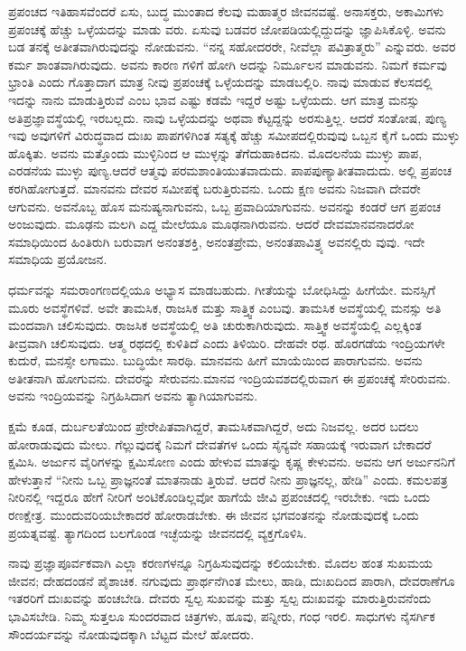 ಪ್ರಪಂಚದ ಇತಿಹಾಸವೆಂದರೆ ಏಸು, ಬುದ್ಧ ಮುಂತಾದ ಕೆಲವು ಮಹಾತ್ಮರ ಜೀವನವಷ್ಟೆ. ಅನಾಸಕ್ತರು, ಅಕಾಮಿಗಳು ಪ್ರಪಂಚಕ್ಕೆ ಹೆಚ್ಚು ಒಳ್ಳೆಯದನ್ನು ಮಾಡು ವರು. ಏಸುವು ಬಡವರ ಜೋಪಡಿಯಲ್ಲಿದ್ದುದನ್ನು ಜ್ಞಾಪಿಸಿಕೊಳ್ಳಿ. ಅವನು ಬಡ ತನಕ್ಕೆ ಅತೀತವಾಗಿರುವುದನ್ನು ನೋಡುವನು. “ನನ್ನ ಸಹೋದರರೇ, ನೀವೆಲ್ಲಾ ಪವಿತ್ರಾತ್ಮರು” ಎನ್ನುವರು. ಅವರ ಕರ್ಮ ಶಾಂತವಾಗಿರುವುದು. ಅವನು ಕಾರಣ ಗಳಿಗೆ ಹೋಗಿ ಅದನ್ನು ನಿರ್ಮೂಲನ ಮಾಡುವನು. ನಿಮಗೆ ಕರ್ಮವು ಭ್ರಾಂತಿ ಎಂದು ಗೊತ್ತಾದಾಗ ಮಾತ್ರ ನೀವು ಪ್ರಪಂಚಕ್ಕೆ ಒಳ್ಳೆಯದನ್ನು ಮಾಡಬಲ್ಲಿರಿ. ನಾವು ಮಾಡುವ ಕೆಲಸದಲ್ಲಿ ಇದನ್ನು ನಾನು ಮಾಡುತ್ತಿರುವೆ ಎಂಬ ಭಾವ ಎಷ್ಟು ಕಡಮೆ ಇದ್ದರೆ ಅಷ್ಟು ಒಳ್ಳೆಯದು. ಆಗ ಮಾತ್ರ ಮನಸ್ಸು ಅತಿಪ್ರಜ್ಞಾವಸ್ಥೆಯಲ್ಲಿ ಇರಬಲ್ಲದು. ನಾವು ಒಳ್ಳೆಯದನ್ನು ಅಥವಾ ಕೆಟ್ಟದ್ದನ್ನು ಅರಸುತ್ತಿಲ್ಲ. ಆದರೆ ಸಂತೋಷ, ಪುಣ್ಯ ಇವು ಅವುಗಳಿಗೆ ವಿರುದ್ಧವಾದ ದುಃಖ ಪಾಪಗಳಿಗಿಂತ ಸತ್ಯಕ್ಕೆ ಹೆಚ್ಚು ಸಮೀಪದಲ್ಲಿರುವುವು ಒಬ್ಬನ ಕೈಗೆ ಒಂದು ಮುಳ್ಳು ಹೊಕ್ಕಿತು. ಅವನು ಮತ್ತೊಂದು ಮುಳ್ಳಿನಿಂದ ಆ ಮುಳ್ಳನ್ನು ತೆಗೆದುಹಾಕಿದನು. ಮೊದಲನೆಯ ಮುಳ್ಳು ಪಾಪ, ಎರಡನೆಯ ಮುಳ್ಳು ಪುಣ್ಯ.ಆದರೆ ಆತ್ಮವು ಪರಮಶಾಂತಿಯುತವಾದುದು. ಪಾಪಪುಣ್ಯಾತೀತವಾದುದು. ಅಲ್ಲಿ ಪ್ರಪಂಚ ಕರಗಿಹೋಗುತ್ತದೆ. ಮಾನವನು ದೇವರ ಸಮೀಪಕ್ಕೆ ಬರುತ್ತಿರುವನು. ಒಂದು ಕ್ಷಣ ಅವನು ನಿಜವಾಗಿ ದೇವರೇ ಆಗುವನು. ಅವನೊಬ್ಬ ಹೊಸ ಮನುಷ್ಯನಾಗುವನು, ಒಬ್ಬ ಪ್ರವಾದಿಯಾಗುವನು. ಅವನನ್ನು ಕಂಡರೆ ಆಗ ಪ್ರಪಂಚ ಅಂಜುವುದು. ಮೂಢನು ಮಲಗಿ ಎದ್ದ ಮೇಲೆಯೂ ಮೂಢನಾಗಿರುವನು. ಆದರೆ ದೇವಮಾನವನಾದರೋ ಸಮಾಧಿಯಿಂದ ಹಿಂತಿರುಗಿ ಬರುವಾಗ ಅನಂತಶಕ್ತಿ, ಅನಂತಪ್ರೇಮ, ಅನಂತಪಾವಿತ್ರ್ಯ ಅವನಲ್ಲಿರು ವುವು. ಇದೇ ಸಮಾಧಿಯ ಪ್ರಯೋಜನ.

ಧರ್ಮವನ್ನು ಸಮರಾಂಗಣದಲ್ಲಿಯೂ ಅಭ್ಯಾಸ ಮಾಡಬಹುದು. ಗೀತೆಯನ್ನು ಬೋಧಿಸಿದ್ದು ಹೀಗೆಯೇ. ಮನಸ್ಸಿಗೆ ಮೂರು ಅವಸ್ಥೆಗಳಿವೆ. ಅವೇ ತಾಮಸಿಕ, ರಾಜಸಿಕ ಮತ್ತು ಸಾತ್ತ್ವಿಕ ಎಂಬವು. ತಾಮಸಿಕ ಅವಸ್ಥೆಯಲ್ಲಿ ಮನಸ್ಸು ಅತಿ ಮಂದವಾಗಿ ಚಲಿಸುವುದು. ರಾಜಸಿಕ ಅವಸ್ಥೆಯಲ್ಲಿ ಅತಿ ಚುರುಕಾಗಿರುವುದು. ಸಾತ್ತ್ವಿಕ ಅವಸ್ಥೆಯಲ್ಲಿ ಎಲ್ಲಕ್ಕಿಂತ ತೀವ್ರವಾಗಿ ಚಲಿಸುವುದು. ಆತ್ಮ ರಥದಲ್ಲಿ ಕುಳಿತಿದೆ ಎಂದು ತಿಳಿಯಿರಿ. ದೇಹವೇ ರಥ. ಹೊರಗಡೆಯ ಇಂದ್ರಿಯಗಳೇ ಕುದುರೆ, ಮನಸ್ಸೇ ಲಗಾಮು. ಬುದ್ಧಿಯೇ ಸಾರಥಿ. ಮಾನವನು ಹೀಗೆ ಮಾಯೆಯಿಂದ ಪಾರಾಗುವನು. ಅವನು ಅತೀತನಾಗಿ ಹೋಗುವನು. ದೇವರನ್ನು ಸೇರುವನು.ಮಾನವ ಇಂದ್ರಿಯವಶದಲ್ಲಿರುವಾಗ ಈ ಪ್ರಪಂಚಕ್ಕೆ ಸೇರಿರುವನು. ಅವನು ಇಂದ್ರಿಯವನ್ನು ನಿಗ್ರಹಿಸಿದಾಗ ಅವನು ತ್ಯಾಗಿಯಾಗುವನು.

ಕ್ಷಮೆ ಕೂಡ, ದುರ್ಬಲತೆಯಿಂದ ಪ್ರೇರೇಪಿತವಾಗಿದ್ದರೆ, ತಾಮಸಿಕವಾಗಿದ್ದರೆ, ಅದು ನಿಜವಲ್ಲ. ಅದರ ಬದಲು ಹೋರಾಡುವುದು ಮೇಲು. ಗೆಲ್ಲುವುದಕ್ಕೆ ನಿಮಗೆ ದೇವತೆಗಳ ಒಂದು ಸೈನ್ಯವೇ ಸಹಾಯಕ್ಕೆ ಇರುವಾಗ ಬೇಕಾದರೆ ಕ್ಷಮಿಸಿ. ಅರ್ಜುನ ವೈರಿಗಳನ್ನು ಕ್ಷಮಿಸೋಣ ಎಂದು ಹೇಳುವ ಮಾತನ್ನು ಕೃಷ್ಣ ಕೇಳುವನು. ಅವನು ಆಗ ಅರ್ಜುನನಿಗೆ ಹೇಳುತ್ತಾನೆ “ನೀನು ಒಬ್ಬ ಪ್ರಾಜ್ಞನಂತೆ ಮಾತನಾಡು ತ್ತಿರುವೆ. ಆದರೆ ನೀನು ಪ್ರಾಜ್ಞನಲ್ಲ, ಹೇಡಿ” ಎಂದು. ಕಮಲಪತ್ರ ನೀರಿನಲ್ಲಿ ಇದ್ದರೂ ಹೇಗೆ ನೀರಿಗೆ ಅಂಟಿಕೊಂಡಿಲ್ಲವೋ ಹಾಗೆಯೆ ಜೀವಿ ಪ್ರಪಂಚದಲ್ಲಿ ಇರಬೇಕು. ಇದು ಒಂದು ರಣಕ್ಷೇತ್ರ. ಮುಂದುವರಿಯಬೇಕಾದರೆ ಹೋರಾಡಬೇಕು. ಈ ಜೀವನ ಭಗವಂತನನ್ನು ನೋಡುವುದಕ್ಕೆ ಒಂದು ಪ್ರಯತ್ನವಷ್ಟೆ. ತ್ಯಾಗದಿಂದ ಬಲಗೊಂಡ ಇಚ್ಛೆಯನ್ನು ಜೀವನದಲ್ಲಿ ವ್ಯಕ್ತಗೊಳಿಸಿ.

ನಾವು ಪ್ರಜ್ಞಾಪೂರ್ವಕವಾಗಿ ಎಲ್ಲಾ ಕರಣಗಳನ್ನೂ ನಿಗ್ರಹಿಸುವುದನ್ನು ಕಲಿಯಬೇಕು. ಮೊದಲ ಹಂತ ಸುಖಮಯ ಜೀವನ; ದೇಹದಂಡನೆ ಪೈಶಾಚಿಕ. ನಗುವುದು ಪ್ರಾರ್ಥನೆಗಿಂತ ಮೇಲು, ಹಾಡಿ, ದುಃಖದಿಂದ ಪಾರಾಗಿ, ದೇವರಾಣೆಗೂ ಇತರರಿಗೆ ದುಃಖವನ್ನು ಹಂಚಬೇಡಿ. ದೇವರು ಸ್ವಲ್ಪ ಸುಖವನ್ನು ಮತ್ತು ಸ್ವಲ್ಪ ದುಃಖವನ್ನು ಮಾರುತ್ತಿರುವನೆಂದು ಭಾವಿಸಬೇಡಿ. ನಿಮ್ಮ ಸುತ್ತಲೂ ಸುಂದರವಾದ ಚಿತ್ರಗಳು, ಹೂವು, ಪನ್ನೀರು, ಗಂಧ ಇರಲಿ. ಸಾಧುಗಳು ನೈಸರ್ಗಿಕ ಸೌಂದರ್ಯವನ್ನು ನೋಡುವುದಕ್ಕಾಗಿ ಬೆಟ್ಟದ ಮೇಲೆ ಹೋದರು.

